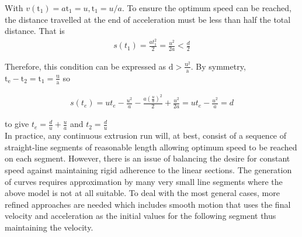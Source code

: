 \documentclass{UoNMCHA}
\numberwithin{equation}{section}
\begin{document}
	With $v\left(\mathrm{t}_{1}\right)=a \mathrm{t}_{1}=u, \mathrm{t}_{1}=u / a .$ To ensure the optimum speed can be reached, the distance travelled
	at the end of acceleration must be less than half the total distance. That is
		\begin{align}
s\left(t_{1}\right)=\frac{a t_{1}^{2}}{2}=\frac{u^{2}}{2 a}<\frac{d}{2}
\end{align}

	Therefore, this condition can be expressed as $\mathrm{d}>\frac{\mathrm{u}^{2}}{\mathrm{a}} .$ By symmetry, $\mathrm{t}_{\mathrm{e}}-\mathrm{t}_{2}=\mathrm{t}_{1}=\frac{\mathrm{u}}{\mathrm{a}}$ so
	
		\begin{align}
	s\left(t_{e}\right)=u t_{e}-\frac{u^{2}}{a}-\frac{a\left(\frac{u}{a}\right)^{2}}{2}+\frac{u^{2}}{2 a}=u t_{e}-\frac{u^{2}}{a}=d
\end{align}

	to give $t_{e}=\frac{d}{u}+\frac{u}{a}$ and $t_{2}=\frac{d}{u}$\\
	
	In practice, any continuous extrusion run will, at best, consist of a sequence of straight-line segments
	of reasonable length allowing optimum speed to be reached on each segment. However, there is an
	issue of balancing the desire for constant speed against maintaining rigid adherence to the linear
	sections. The generation of curves requires approximation by many very small line segments where the
	above model is not at all suitable. To deal with the most general cases, more refined approaches are
	needed which includes smooth motion that uses the final velocity and acceleration as the initial values
	for the following segment thus maintaining the velocity.
	
	\newpage
	
\end{document}
